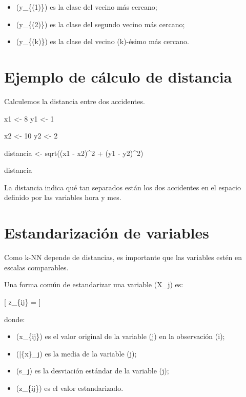 \documentclass[
  11pt,
  letterpaper,
]{book}
\newenvironment{Shaded}{\begin{snugshade}}{\end{snugshade}}
\newcommand{\DecValTok}[1]{\textcolor[rgb]{0.68,0.00,0.00}{#1}}
\newcommand{\FunctionTok}[1]{\textcolor[rgb]{0.28,0.35,0.67}{#1}}
\newcommand{\NormalTok}[1]{\textcolor[rgb]{0.00,0.23,0.31}{#1}}
\newcommand{\OtherTok}[1]{\textcolor[rgb]{0.00,0.23,0.31}{#1}}
\newcommand{\SpecialCharTok}[1]{\textcolor[rgb]{0.37,0.37,0.37}{#1}}
\providecommand{\tightlist}{%
  \setlength{\itemsep}{0pt}\setlength{\parskip}{0pt}}
\begin{document}
\begin{itemize}
\tightlist
\item
  (y\_\{(1)\}) es la clase del vecino más cercano;
\item
  (y\_\{(2)\}) es la clase del segundo vecino más cercano;
\item
  (y\_\{(k)\}) es la clase del vecino (k)-ésimo más cercano.
\end{itemize}

\section{Ejemplo de cálculo de
distancia}\label{ejemplo-de-cuxe1lculo-de-distancia}

Calculemos la distancia entre dos accidentes.

\begin{Shaded}
\begin{Highlighting}[]
\NormalTok{x1 }\OtherTok{\textless{}{-}} \DecValTok{8}
\NormalTok{y1 }\OtherTok{\textless{}{-}} \DecValTok{1}

\NormalTok{x2 }\OtherTok{\textless{}{-}} \DecValTok{10}
\NormalTok{y2 }\OtherTok{\textless{}{-}} \DecValTok{2}

\NormalTok{distancia }\OtherTok{\textless{}{-}} \FunctionTok{sqrt}\NormalTok{((x1 }\SpecialCharTok{{-}}\NormalTok{ x2)}\SpecialCharTok{\^{}}\DecValTok{2} \SpecialCharTok{+}\NormalTok{ (y1 }\SpecialCharTok{{-}}\NormalTok{ y2)}\SpecialCharTok{\^{}}\DecValTok{2}\NormalTok{)}

\NormalTok{distancia}
\end{Highlighting}
\end{Shaded}

La distancia indica qué tan separados están los dos accidentes en el
espacio definido por las variables hora y mes.

\section{Estandarización de
variables}\label{estandarizaciuxf3n-de-variables}

Como k-NN depende de distancias, es importante que las variables estén
en escalas comparables.

Una forma común de estandarizar una variable (X\_j) es:

{[} z\_\{ij\} =  {]}

donde:

\begin{itemize}
\tightlist
\item
  (x\_\{ij\}) es el valor original de la variable (j) en la observación
  (i);
\item
  (\bar\{x\}\_j) es la media de la variable (j);
\item
  (s\_j) es la desviación estándar de la variable (j);
\item
  (z\_\{ij\}) es el valor estandarizado.
\end{itemize}
\end{document}
